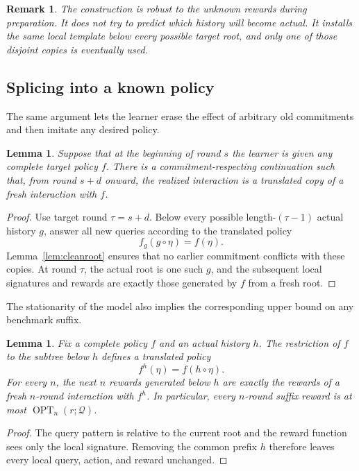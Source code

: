 \documentclass[11pt]{article}
\newtheorem{lemma}[theorem]{Lemma}
\newtheorem{remark}[theorem]{Remark}
\newcommand{\QQ}{\mathcal Q}
\newcommand{\OPT}{\operatorname{OPT}}
\begin{document}
\begin{remark}
The construction is robust to the unknown rewards during preparation.  It does not try to predict which history will become actual.  It installs the same local template below every possible target root, and only one of those disjoint copies is eventually used.
\end{remark}

\subsection{Splicing into a known policy}

The same argument lets the learner erase the effect of arbitrary old commitments and then imitate any desired policy.

\begin{lemma}\label{lem:splice}
Suppose that at the beginning of round $s$ the learner is given any complete target policy $f$.  There is a commitment-respecting continuation such that, from round $s+d$ onward, the realized interaction is a translated copy of a fresh interaction with $f$.
\end{lemma}

\begin{proof}
Use target round $\tau=s+d$.  Below every possible length-$(\tau-1)$ actual history $g$, answer all new queries according to the translated policy
\[
    f_g(g\circ\eta)=f(\eta).
\]
Lemma~\ref{lem:cleanroot} ensures that no earlier commitment conflicts with these copies.  At round $\tau$, the actual root is one such $g$, and the subsequent local signatures and rewards are exactly those generated by $f$ from a fresh root.
\end{proof}

The stationarity of the model also implies the corresponding upper bound on any benchmark suffix.

\begin{lemma}\label{lem:suffix}
Fix a complete policy $f$ and an actual history $h$.  The restriction of $f$ to the subtree below $h$ defines a translated policy
\[
    f^{h}(\eta)=f(h\circ\eta).
\]
For every $n$, the next $n$ rewards generated below $h$ are exactly the rewards of a fresh $n$-round interaction with $f^h$.  In particular, every $n$-round suffix reward is at most $\OPT_n(r;\QQ)$.
\end{lemma}

\begin{proof}
The query pattern is relative to the current root and the reward function sees only the local signature.  Removing the common prefix $h$ therefore leaves every local query, action, and reward unchanged.
\end{proof}
\end{document}
